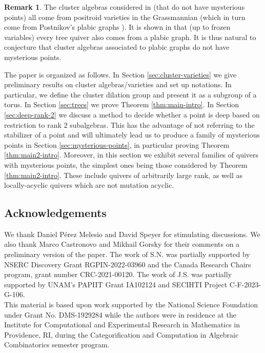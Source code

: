 \documentclass{amsart}
\numberwithin{equation}{section}
\theoremstyle{definition}
\newtheorem{remark}[theorem]{Remark}
\begin{document}
\begin{remark}
The cluster algebras considered in \cite{deep} (that do not have mysterious points) all come from positroid varieties in the Grassmannian \cite{GL-positroid} (which in turn come from Postnikov's plabic graphs \cite{postnikov}). It is shown in \cite{schwartz} that (up to frozen variables) every tree quiver also comes from a plabic graph. It is thus natural to conjecture that cluster algebras associated to plabic graphs do not have mysterious points. 
\end{remark}

The paper is organized as follows. In Section \ref{sec:cluster-varieties} we give preliminary results on cluster algebras/varieties and set up notations. In particular, we define the cluster dilation group and present it as a subgroup of a torus. In Section \ref{sec:trees} we prove Theorem \ref{thm:main-intro}. In Section \ref{sec:deep-rank-2} we discuss a method to decide whether a point is deep based on restriction to  rank $2$ subalgebras. This has the advantage of not referring to the stabilizer of a point and will ultimately lead us to produce a family of mysterious points in Section \ref{sec:mysterious-points}, in particular proving Theorem \ref{thm:main2-intro}. Moreover, in this section we exhibit several families of quivers with mysterious points, the simplest ones being those considered by Theorem \ref{thm:main2-intro}. %
These include quivers of arbitrarily large rank, as well as locally-acyclic quivers which are not mutation acyclic. 



\subsection*{Acknowledgements} We thank Daniel Pérez Melesio and David Speyer for stimulating discussions. We also thank Marco Castronovo and Mikhail Gorsky for their comments on a preliminary version of the paper. The work of S.N. was partially supported by NSERC Discovery Grant RGPIN-2022-03960 and the Canada Research Chairs program, grant number CRC-2021-00120. The work of J.S. was partially supported by UNAM’s PAPIIT Grant IA102124 and SECIHTI Project C-F-2023-G-106.\\

This material is based upon work supported by the National Science Foundation under Grant No. DMS-1929284 while the authors were in residence at the Institute for Computational and Experimental Research in Mathematics in Providence, RI, during the Categorification and Computation in Algebraic Combinatorics semester program.
\end{document}
